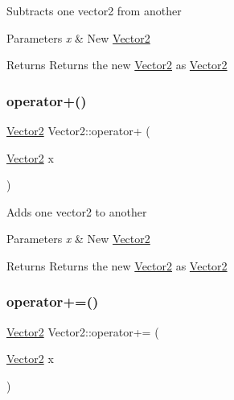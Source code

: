 Subtracts one vector2 from another 
\begin{DoxyParams}{Parameters}
{\em x} & New \mbox{\hyperlink{struct_vector2}{Vector2}} \\
\hline
\end{DoxyParams}
\begin{DoxyReturn}{Returns}
Returns the new \mbox{\hyperlink{struct_vector2}{Vector2}} as \mbox{\hyperlink{struct_vector2}{Vector2}} 
\end{DoxyReturn}
\mbox{\label{struct_vector2_a2a517dda544bc45e6e06dd4ea983c5d7}} 
\subsubsection{\texorpdfstring{operator+()}{operator+()}}
{\footnotesize\ttfamily \mbox{\hyperlink{struct_vector2}{Vector2}} Vector2\+::operator+ (\begin{DoxyParamCaption}\item[{\mbox{\hyperlink{struct_vector2}{Vector2}}}]{x }\end{DoxyParamCaption})\hspace{0.3cm}{\ttfamily [inline]}}

Adds one vector2 to another 
\begin{DoxyParams}{Parameters}
{\em x} & New \mbox{\hyperlink{struct_vector2}{Vector2}} \\
\hline
\end{DoxyParams}
\begin{DoxyReturn}{Returns}
Returns the new \mbox{\hyperlink{struct_vector2}{Vector2}} as \mbox{\hyperlink{struct_vector2}{Vector2}} 
\end{DoxyReturn}
\mbox{\label{struct_vector2_a7ed76b87b79c2a20b08788328dcf592e}} 
\subsubsection{\texorpdfstring{operator+=()}{operator+=()}}
{\footnotesize\ttfamily \mbox{\hyperlink{struct_vector2}{Vector2}} Vector2\+::operator+= (\begin{DoxyParamCaption}\item[{\mbox{\hyperlink{struct_vector2}{Vector2}}}]{x }\end{DoxyParamCaption})\hspace{0.3cm}{\ttfamily [inline]}}

